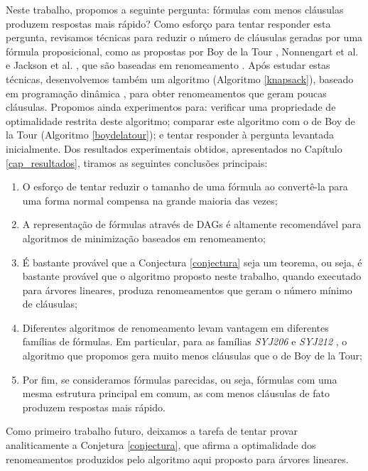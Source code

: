 
\label{cap_conclusao}

\indent

Neste trabalho, propomos a seguinte pergunta: fórmulas com menos cláusulas produzem respostas mais rápido? Como esforço para tentar responder esta pergunta, revisamos técnicas para reduzir o número de cláusulas geradas por uma fórmula proposicional, como as propostas por Boy de la Tour \cite{de1992optimality}, Nonnengart et al. \cite{nonnengart2001computing} e Jackson et al. \cite{jackson2004clause}, que são baseadas em renomeamento \cite{plaisted1986structure}. Após estudar estas técnicas, desenvolvemos também um algoritmo (Algoritmo \ref{knapsack}), baseado em programação dinâmica \cite{bellman2015applied}, para obter renomeamentos que geram poucas cláusulas. Propomos ainda experimentos para: verificar uma propriedade de optimalidade restrita deste algoritmo; comparar este algoritmo com o de Boy de la Tour (Algoritmo \ref{boydelatour}); e tentar responder à pergunta levantada inicialmente. Dos resultados experimentais obtidos, apresentados no Capítulo \ref{cap_resultados}, tiramos as seguintes conclusões principais:
\begin{enumerate}
	\item O esforço de tentar reduzir o tamanho de uma fórmula ao convertê-la para uma forma normal compensa na grande maioria das vezes;
	\item A representação de fórmulas através de DAGs é altamente recomendável para algoritmos de minimização baseados em renomeamento;
	\item É bastante provável que a Conjectura \ref{conjectura} seja um teorema, ou seja, é bastante provável que o algoritmo proposto neste trabalho, quando executado para árvores lineares, produza renomeamentos que geram o número mínimo de cláusulas;
	\item Diferentes algoritmos de renomeamento levam vantagem em diferentes famílias de fórmulas. Em particular, para as famílias \emph{SYJ206} e \emph{SYJ212} \cite{raths07jar}, o algoritmo que propomos gera muito menos cláusulas que o de Boy de la Tour;
	\item Por fim, se consideramos fórmulas parecidas, ou seja, fórmulas com uma mesma estrutura principal em comum, as com menos cláusulas de fato produzem respostas mais rápido.
\end{enumerate}

Como primeiro trabalho futuro, deixamos a tarefa de tentar provar analiticamente a Conjetura \ref{conjectura}, que afirma a optimalidade dos renomeamentos produzidos pelo algoritmo aqui proposto para árvores lineares.

